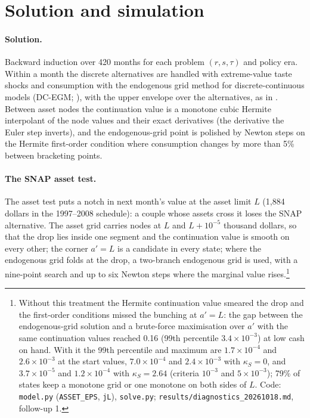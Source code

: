 \documentclass[11pt]{article}
\newcommand{\code}[1]{\texttt{#1}}
\newcommand{\1}{\mathbf{1}}
\begin{document}
\section{Solution and simulation}\label{sec:solution}

\paragraph{Solution.} Backward induction over 420 months for each problem $(r, s, \tau)$ and policy era. Within a month
the discrete alternatives are handled with extreme-value taste shocks and consumption with the endogenous grid method
for discrete-continuous models (DC-EGM; \citealp{carroll2006method, iskhakov2017endogenous}), with the upper envelope
over the alternatives, as in \citet{bacher2025joint}. Between asset nodes the continuation value is a monotone cubic
Hermite interpolant of the node values and their exact derivatives (the derivative the Euler step inverts), and the
endogenous-grid point is polished by Newton steps on the Hermite first-order condition where consumption changes by
more than 5\% between bracketing points.

\paragraph{The SNAP asset test.} The asset test puts a notch in next month's value at the asset limit $L$ (1{,}884
dollars in the 1997--2008 schedule): a couple whose assets cross it loses the SNAP alternative. The asset grid carries
nodes at $L$ and $L + 10^{-5}$ thousand dollars, so that the drop lies inside one segment and the continuation value is
smooth on every other; the corner $a' = L$ is a candidate in every state; where the endogenous grid folds at the drop,
a two-branch endogenous grid is used, with a nine-point search and up to six Newton steps where the marginal value
rises.\footnote{Without this treatment the Hermite continuation value smeared the drop and the first-order conditions
missed the bunching at $a' = L$: the gap between the endogenous-grid solution and a brute-force maximisation over $a'$
with the same continuation values reached 0.16 (99th percentile $3.4 \times 10^{-3}$) at low cash on hand. With it
the 99th percentile and maximum are $1.7 \times 10^{-4}$ and $2.6 \times 10^{-3}$ at the start values,
$7.0 \times 10^{-4}$ and $2.4 \times 10^{-3}$ with $\kappa_S = 0$, and $3.7 \times 10^{-5}$ and $1.2 \times 10^{-4}$
with $\kappa_S = 2.64$ (criteria $10^{-3}$ and $5 \times 10^{-3}$); 79\% of states keep a monotone grid or one monotone
on both sides of $L$. Code: \code{model.py} (\code{ASSET\_EPS}, \code{jL}), \code{solve.py};
\code{results/diagnostics\_20261018.md}, follow-up 1.}
\end{document}
